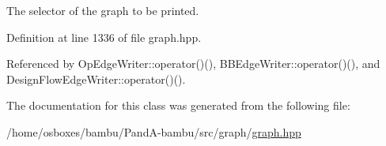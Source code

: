 The selector of the graph to be printed. 



Definition at line 1336 of file graph.\+hpp.



Referenced by Op\+Edge\+Writer\+::operator()(), B\+B\+Edge\+Writer\+::operator()(), and Design\+Flow\+Edge\+Writer\+::operator()().



The documentation for this class was generated from the following file\+:\begin{DoxyCompactItemize}
\item 
/home/osboxes/bambu/\+Pand\+A-\/bambu/src/graph/\hyperlink{graph_8hpp}{graph.\+hpp}\end{DoxyCompactItemize}
